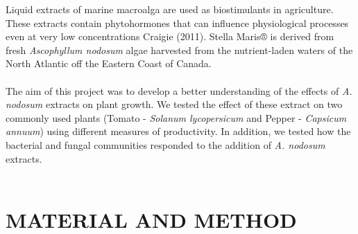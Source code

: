 \documentclass[11pt,]{article}
\begin{document}
Liquid extracts of marine macroalga are used as biostimulants in
agriculture. These extracts contain phytohormones that can influence
physiological processes even at very low concentrations Craigie (2011).
Stella Maris® is derived from fresh \emph{Ascophyllum nodosum} algae
harvested from the nutrient-laden waters of the North Atlantic off the
Eastern Coast of Canada.\\
\hspace*{0.333em}\\
The aim of this project was to develop a better understanding of the
effects of \emph{A. nodosum} extracts on plant growth. We tested the
effect of these extract on two commonly used plants (Tomato -
\emph{Solanum lycopersicum} and Pepper - \emph{Capsicum annuum}) using
different measures of productivity. In addition, we tested how the
bacterial and fungal communities responded to the addition of \emph{A.
nodosum} extracts.\\
\hspace*{0.333em} ~

\section{MATERIAL AND METHOD}\label{material-and-method}
\end{document}
